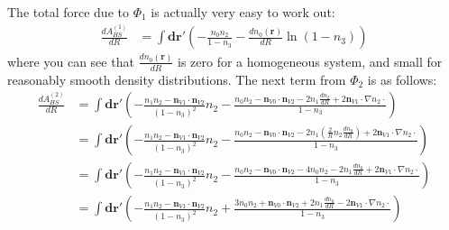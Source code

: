 \documentclass[letterpaper,twocolumn,amsmath,amssymb,prb]{revtex4-1}
\begin{document}
\begin{widetext}
The total force due to $\Phi_1$ is actually very easy to work out:
\begin{align}
  \frac{d A_{HS}^{(1)}}{d R} &=
  \int \mathbf{dr}' \left(-\frac{n_0n_2}{1-n_3} - \frac{dn_0(\mathbf{r})}{dR}\ln(1-n_3) \right)
\end{align}
where you can see that $\frac{dn_0(\mathbf{r})}{dR}$ is zero for a
homogeneous system, and small for reasonably smooth density
distributions.  The next term from $\Phi_2$ is as follows:
\begin{align}
  \frac{d A_{HS}^{(2)}}{d R} &=
  \int \mathbf{dr}' \left(
    -\frac{n_1 n_2 - \mathbf{n}_{V1} \cdot\mathbf{n}_{V2}}{(1-n_3)^2}
    n_2
    - \frac{n_0n_2 - \mathbf{n}_{V0} \cdot\mathbf{n}_{V2} - 2 n_1
      \frac{dn_2}{dR} + 2 \mathbf{n}_{V1} \cdot \nabla n_2 \cdot
    }{1-n_3}
  \right) \\
  &= \int \mathbf{dr}' \left(
    -\frac{n_1 n_2 - \mathbf{n}_{V1} \cdot\mathbf{n}_{V2}}{(1-n_3)^2}
    n_2
    - \frac{n_0n_2 - \mathbf{n}_{V0} \cdot\mathbf{n}_{V2}
      - 2 n_1 \left(\frac2{R}n_2 \frac{dn_0}{dR}\right)
      + 2 \mathbf{n}_{V1} \cdot \nabla n_2 \cdot }{1-n_3}
  \right) \\
  &= \int \mathbf{dr}' \left(
    -\frac{n_1 n_2 - \mathbf{n}_{V1} \cdot\mathbf{n}_{V2}}{(1-n_3)^2}
    n_2
    - \frac{n_0n_2 - \mathbf{n}_{V0} \cdot\mathbf{n}_{V2}
      - 4 n_0n_2 - 2 n_1\frac{dn_0}{dR}
      + 2 \mathbf{n}_{V1} \cdot \nabla n_2 \cdot }{1-n_3}
  \right) \\
  &= \int \mathbf{dr}' \left(
    -\frac{n_1 n_2 - \mathbf{n}_{V1} \cdot\mathbf{n}_{V2}}{(1-n_3)^2}
    n_2
    + \frac{3n_0n_2 + \mathbf{n}_{V0} \cdot\mathbf{n}_{V2}
      + 2 n_1\frac{dn_0}{dR}
      - 2 \mathbf{n}_{V1} \cdot \nabla n_2 \cdot }{1-n_3}
  \right)
\end{align}


\end{widetext}
\end{document}
